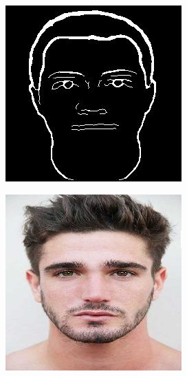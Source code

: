 \documentclass{70_styles/svproc}
\begin{document}
\begin{figure}
\begin{minipage}[b]{0.47\textwidth}
\begin{subfigure}[H]{0.4\textwidth}
     \end{subfigure}
     \begin{subfigure}[H]{0.4\textwidth}
         \centering
         \includegraphics[width=\textwidth]{70_figures/thinned-1 (662).jpg}
     \end{subfigure}
     \caption{Results on running the algorithm on low resolution images from a different dataset.}
    \end{minipage}%
    \hspace{0.05\textwidth}
    \begin{minipage}[b]{0.47\textwidth}
        \centering
     \begin{subfigure}[b]{0.4\textwidth}
         \centering
         \includegraphics[width=\textwidth]{70_figures/1 (1).jpg}

\end{subfigure}
\end{minipage}
\end{figure}
\end{document}

